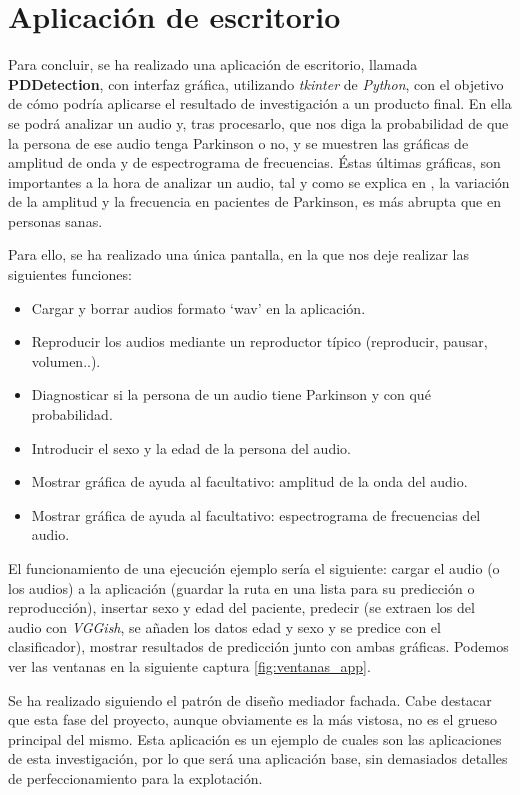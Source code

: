 \section{Aplicación de escritorio}
Para concluir, se ha realizado una aplicación de escritorio, llamada \textbf{PDDetection}, con interfaz gráfica, utilizando \textit{tkinter} de \textit{Python}, con el objetivo de cómo podría aplicarse el resultado de investigación a un producto final. En ella se podrá analizar un audio y, tras procesarlo, que nos diga la probabilidad de que la persona de ese audio tenga Parkinson o no, y se muestren las gráficas de amplitud de onda y de espectrograma de frecuencias. Éstas últimas gráficas, son importantes a la hora de analizar un audio, tal y como se explica en \cite{godino2017towards}, la variación de la amplitud y la frecuencia en pacientes de Parkinson, es más abrupta que en personas sanas.

Para ello, se ha realizado una única pantalla, en la que nos deje realizar las siguientes funciones:
\begin{itemize}
\item Cargar y borrar audios formato `wav' en la aplicación.
\item Reproducir los audios mediante un reproductor típico (reproducir, pausar, volumen..).
\item Diagnosticar si la persona de un audio tiene Parkinson y con qué probabilidad.
\item Introducir el sexo y la edad de la persona del audio.
\item Mostrar gráfica de ayuda al facultativo: amplitud de la onda del audio.
\item Mostrar gráfica de ayuda al facultativo: espectrograma de frecuencias del audio.
\end{itemize}

El funcionamiento de una ejecución ejemplo sería el siguiente: cargar el audio (o los audios) a la aplicación (guardar la ruta en una lista para su predicción o reproducción), insertar sexo y edad del paciente, predecir (se extraen los  del audio con \textit{VGGish}, se añaden los datos edad y sexo y se predice con el clasificador), mostrar resultados de predicción junto con ambas gráficas. Podemos ver las ventanas en la siguiente captura \ref{fig:ventanas_app}.


Se ha realizado siguiendo el patrón de diseño mediador fachada. Cabe destacar que esta fase del proyecto, aunque obviamente es la más vistosa, no es el grueso principal del mismo. Esta aplicación es un ejemplo de cuales son las aplicaciones de esta investigación, por lo que será una aplicación base, sin demasiados detalles de perfeccionamiento para la explotación. 

